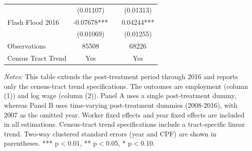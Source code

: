 \begin{supptable}[H]
{\begin{threeparttable}
\begin{tabular}{lccc}
                     & (0.01107) &       & (0.01313)\\
    Flash Flood 2016 & -0.07678*** &       & 0.04244***\\
                     & (0.01069) &       & (0.01255)\\
    \midrule
    Observations & 85508 &       & 68226\\
    Census Tract Trend & Yes &       & Yes\\
    \bottomrule
    \end{tabular}%
    \begin{tablenotes}[flushleft]
    \item \small \textit{Notes:} This table extends the post-treatment period through 2016 and reports only the census-tract trend specifications. The outcomes are employment (column (1)) and log wage (column (2)). Panel A uses a single post-treatment dummy, whereas Panel B uses time-varying post-treatment dummies (2008-2016), with 2007 as the omitted year. Worker fixed effects and year fixed effects are included in all estimations. Census-tract trend specifications include a tract-specific linear trend. Two-way clustered standard errors (year and CPF) are shown in parentheses. *** p$<$0.01, ** p$<$0.05, * p$<$0.10.
    \end{tablenotes}
 \end{threeparttable}
 }
\end{supptable}%
